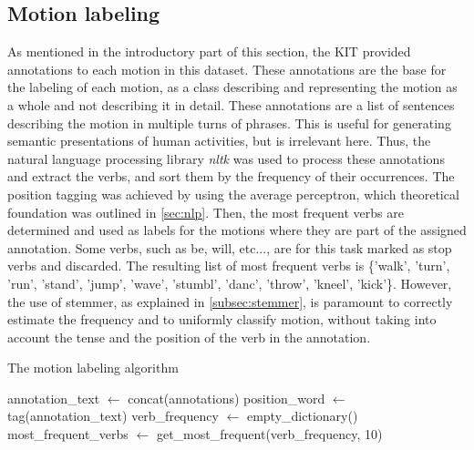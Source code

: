 		\subsection{Motion labeling}
			As mentioned in the introductory part of this section, the KIT provided annotations to each motion in this dataset. These annotations are the base for the labeling of each motion, as a class describing and representing the motion as a whole and not describing it in detail. These annotations are a list of sentences describing the motion in multiple turns of phrases. This is useful for generating semantic presentations of human activities, but is irrelevant here. Thus, the natural language processing library \textit{nltk} was used to process these annotations and extract the verbs, and sort them by the frequency of their occurrences.\newline
			The position tagging was achieved by using the average perceptron, which theoretical foundation was outlined in \ref{sec:nlp}. Then, the most frequent verbs are determined and used as labels for the motions where they are part of the assigned annotation. Some verbs, such as be, will, etc..., are for this task marked as stop verbs and discarded. The resulting list of most frequent verbs is \{'walk', 'turn', 'run', 'stand', 'jump', 'wave', 'stumbl', 'danc', 'throw', 'kneel', 'kick'\}. However, the use of stemmer, as explained in \ref{subsec:stemmer}, is paramount to correctly estimate the frequency and to uniformly classify motion, without taking into account the tense and the position of the verb in the annotation.\newline
			\begin{algorithm}[H]
				\caption{The motion labeling algorithm}\label{alg:motionlabeling}
				annotation\_text $\gets$ concat(annotations)\;
				position\_word $\gets$ tag(annotation\_text)\; 
				verb\_frequency $\gets$ empty\_dictionary()\;
				most\_frequent\_verbs $\gets$ get\_most\_frequent(verb\_frequency, 10)\;
			\end{algorithm}
